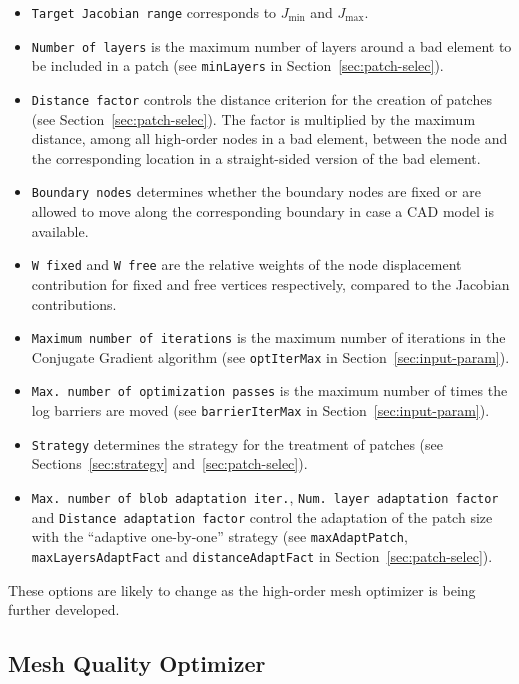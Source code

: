 \documentclass[12pt,a4paper,a4wide]{article}
\begin{document}
\begin{itemize}
\item \texttt{Target Jacobian range} corresponds to $J_{\min}$ and
$J_{\max}$.
\item \texttt{Number of layers} is the maximum number of layers
around a bad element to be included in a patch (see \texttt{minLayers}
in Section~\ref{sec:patch-selec}).
\item \texttt{Distance factor} controls the distance criterion
for the creation of patches (see Section~\ref{sec:patch-selec}). The
factor is multiplied by the maximum distance, among all high-order
nodes in a bad element, between the node and the corresponding location
in a straight-sided version of the bad element.
\item \texttt{Boundary nodes} determines whether the boundary nodes
are fixed or are allowed to move along the corresponding boundary
in case a CAD model is available.
\item \texttt{W fixed} and \texttt{W free} are the relative weights
of the node displacement contribution for fixed and free vertices
respectively, compared to the Jacobian contributions.
\item \texttt{Maximum number of iterations} is the maximum number
of iterations in the Conjugate Gradient algorithm (see
\texttt{optIterMax} in Section~\ref{sec:input-param}).
\item \texttt{Max. number of optimization passes} is the maximum number
of times the log barriers are moved (see \texttt{barrierIterMax} in
Section~\ref{sec:input-param}).
\item \texttt{Strategy} determines the strategy for the treatment of
patches (see Sections~\ref{sec:strategy} and~\ref{sec:patch-selec}).
\item \texttt{Max. number of blob adaptation iter.},
\texttt{Num. layer adaptation factor} and
\texttt{Distance adaptation factor} control the adaptation of the
patch size with the ``adaptive one-by-one'' strategy (see
\texttt{maxAdaptPatch}, \texttt{maxLayersAdaptFact} and
\texttt{distanceAdaptFact} in Section~\ref{sec:patch-selec}).
\end{itemize}

These options are likely to change as the high-order mesh
optimizer is being further developed.


\subsection{Mesh Quality Optimizer}
\end{document}
